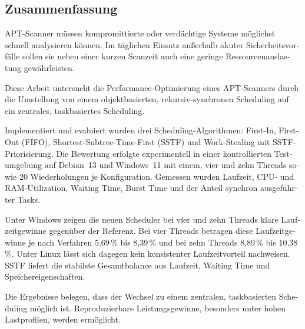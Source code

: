 \begin{otherlanguage}{ngerman}
	\chapter*{Zusammenfassung}
	\begin{sloppypar}
	\noindent \acs{APT}-Scanner müssen kompromittierte oder 
	verdächtige Systeme möglichst schnell analysieren können. 
	Im täglichen Einsatz außerhalb akuter Sicherheitsvorfälle 
	sollen sie neben einer kurzen Scanzeit auch 
	eine geringe Ressourcenauslastung gewährleisten. 
	\vspace{7.56mm}

	\noindent Diese Arbeit untersucht die Performance-Optimierung eines \acs{APT}-Scanners durch die Umstellung von einem objektbasierten, rekursiv-synchronen Scheduling auf ein zentrales, taskbasiertes Scheduling. 

	\vspace{7.56mm}

	\noindent Implementiert und evaluiert wurden drei Scheduling-Algorithmen: First-In, First-Out (\acs{FIFO}), Shortest-Subtree-Time-First (\acs{SSTF}) und Work-Stealing mit \acs{SSTF}-Priorisierung. 
	Die Bewertung erfolgte experimentell in einer kontrollierten Testumgebung auf Debian~13 und Windows~11 mit einem, vier und zehn Threads sowie 20 Wiederholungen je Konfiguration. 
	Gemessen wurden Laufzeit, \acs{CPU}- und \acs{RAM}-Utilization, Waiting Time, Burst Time und der Anteil synchron ausgeführter Tasks. 

	\vspace{7.56mm}

	\noindent Unter Windows zeigen die neuen Scheduler bei vier und zehn Threads klare Laufzeitgewinne gegenüber der Referenz. 
	Bei vier Threads betragen diese Laufzeitgewinne je nach Verfahren 5,69\,\% bis 8,39\,\% und bei zehn Threads 8,89\,\% bis 10,38\,\%. 
	Unter Linux lässt sich dagegen kein konsistenter Laufzeitvorteil nachweisen. 
	\acs{SSTF} liefert die stabilste Gesamtbalance aus Laufzeit, Waiting Time und Speichereigenschaften.

	\vspace{7.56mm}

	\noindent Die Ergebnisse belegen, dass der Wechsel zu einem zentralen, taskbasierten Scheduling möglich ist. 
	Reproduzierbare Leistungsgewinne, besonders unter hohen Lastprofilen, werden ermöglicht.
	\end{sloppypar}

\end{otherlanguage}
